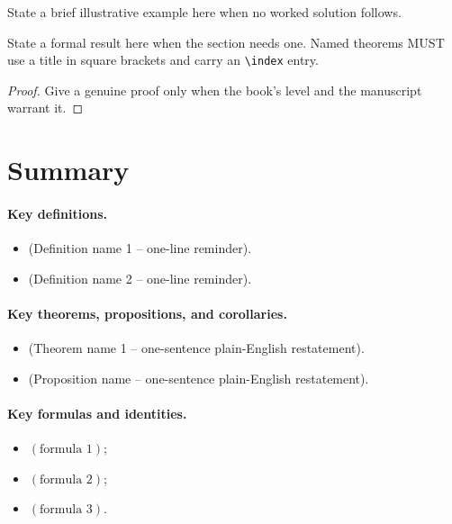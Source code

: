\begin{example}
State a brief illustrative example here when no worked solution follows.
\end{example}

\begin{theorem}
State a formal result here when the section needs one. Named theorems MUST
use a title in square brackets and carry an \texttt{\textbackslash index}
entry.
\end{theorem}

\begin{proof}
Give a genuine proof only when the book's level and the manuscript warrant it.
\end{proof}


\section*{Summary}


\paragraph{Key definitions.}
\begin{itemize}
    \item (Definition name 1 -- one-line reminder).
    \item (Definition name 2 -- one-line reminder).
\end{itemize}

\paragraph{Key theorems, propositions, and corollaries.}
\begin{itemize}
    \item (Theorem name 1 -- one-sentence plain-English restatement).
    \item (Proposition name -- one-sentence plain-English restatement).
\end{itemize}

\paragraph{Key formulas and identities.}
\begin{itemize}
    \item \((\text{formula 1})\);
    \item \((\text{formula 2})\);
    \item \((\text{formula 3})\).
\end{itemize}
